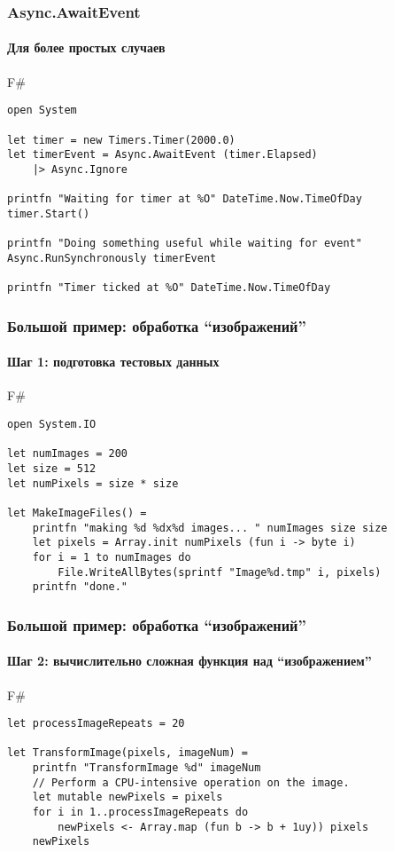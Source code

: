 \documentclass[xetex,mathserif,serif]{beamer}
\begin{document}
	\begin{frame}[fragile]
		\frametitle{Async.AwaitEvent}
		\framesubtitle{Для более простых случаев}
		\begin{exampleblock}{F\#}
			\begin{verbatim}
open System

let timer = new Timers.Timer(2000.0)
let timerEvent = Async.AwaitEvent (timer.Elapsed) 
    |> Async.Ignore

printfn "Waiting for timer at %O" DateTime.Now.TimeOfDay
timer.Start()

printfn "Doing something useful while waiting for event"
Async.RunSynchronously timerEvent

printfn "Timer ticked at %O" DateTime.Now.TimeOfDay
			\end{verbatim}
		\end{exampleblock}
\end{frame}

	\begin{frame}[fragile]
		\frametitle{Большой пример: обработка ``изображений''}
		\framesubtitle{Шаг 1: подготовка тестовых данных}
		\begin{exampleblock}{F\#}
			\begin{verbatim}
open System.IO

let numImages = 200
let size = 512
let numPixels = size * size

let MakeImageFiles() =
    printfn "making %d %dx%d images... " numImages size size
    let pixels = Array.init numPixels (fun i -> byte i)
    for i = 1 to numImages do
        File.WriteAllBytes(sprintf "Image%d.tmp" i, pixels)
    printfn "done."
			\end{verbatim}
		\end{exampleblock}
\end{frame}

	\begin{frame}[fragile]
		\frametitle{Большой пример: обработка ``изображений''}
		\framesubtitle{Шаг 2: вычислительно сложная функция над ``изображением''}
		\begin{exampleblock}{F\#}
			\begin{verbatim}
let processImageRepeats = 20

let TransformImage(pixels, imageNum) =
    printfn "TransformImage %d" imageNum
    // Perform a CPU-intensive operation on the image.
    let mutable newPixels = pixels
    for i in 1..processImageRepeats do 
        newPixels <- Array.map (fun b -> b + 1uy)) pixels
    newPixels
			\end{verbatim}
		\end{exampleblock}
\end{frame}
\end{document}
